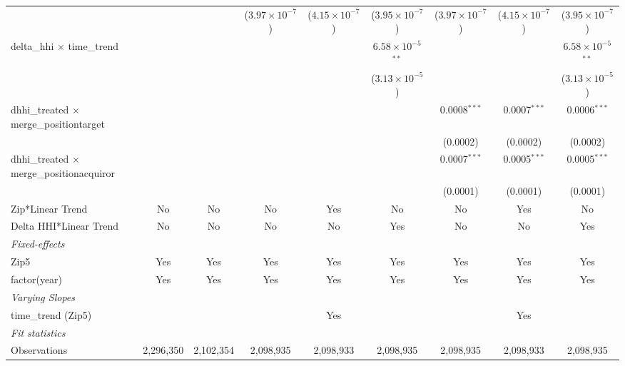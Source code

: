 \begin{table}[H]
{\begin{tabular}{lcccccccc}
   &   &    & ($3.97\times 10^{-7}$) & ($4.15\times 10^{-7}$) & ($3.95\times 10^{-7}$) & ($3.97\times 10^{-7}$) & ($4.15\times 10^{-7}$) & ($3.95\times 10^{-7}$)\\ 

 delta\_hhi $\times $ time\_trend&   &    &    &    & $6.58\times 10^{-5}$$^{**}$ &    &    & $6.58\times 10^{-5}$$^{**}$\\ 

   &   &    &    &    & ($3.13\times 10^{-5}$) &    &    & ($3.13\times 10^{-5}$)\\ 

 dhhi\_treated $\times $ merge\_positiontarget&   &    &    &    &    & 0.0008$^{***}$ & 0.0007$^{***}$ & 0.0006$^{***}$\\ 

   &   &    &    &    &    & (0.0002) & (0.0002) & (0.0002)\\ 

 dhhi\_treated $\times $ merge\_positionacquiror&   &    &    &    &    & 0.0007$^{***}$ & 0.0005$^{***}$ & 0.0005$^{***}$\\ 

   &   &    &    &    &    & (0.0001) & (0.0001) & (0.0001)\\ 

 Zip*Linear Trend & No & No & No & Yes & No & No & Yes & No\\ 

 Delta HHI*Linear Trend & No & No & No & No & Yes & No & No & Yes\\ 

 \midrule \emph{Fixed-effects}&   &   &   &   &   &   &   &  \\ 

 Zip5 & Yes & Yes & Yes & Yes & Yes & Yes & Yes & Yes\\ 

 factor(year) & Yes & Yes & Yes & Yes & Yes & Yes & Yes & Yes\\ 

 \midrule \emph{Varying Slopes}&   &   &   &   &   &   &   &  \\ 

 time\_trend (Zip5) &  &  &  & Yes &  &  & Yes & \\ 

 \midrule \emph{Fit statistics}&  & & & & & & & \\ 

 Observations & 2,296,350&2,102,354&2,098,935&2,098,933&2,098,935&2,098,935&2,098,933&2,098,935\\ 


\end{tabular}}
\end{table}
